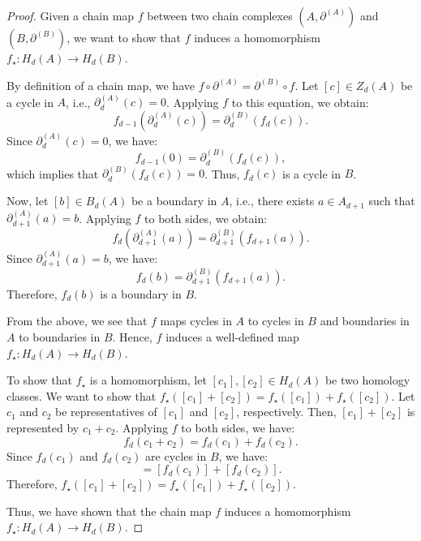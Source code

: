 \begin{proof}
Given a chain map $f$ between two chain complexes $(A, \partial^{(A)})$ and $(B, \partial^{(B)})$, we want to show that $f$ induces a homomorphism $f_\star: H_d(A) \rightarrow H_d(B)$.

By definition of a chain map, we have $f \circ \partial^{(A)} = \partial^{(B)} \circ f$. Let $[c] \in Z_d(A)$ be a cycle in $A$, i.e., $\partial^{(A)}_d(c) = 0$. Applying $f$ to this equation, we obtain:
\begin{equation}
f_{d-1}(\partial^{(A)}_d(c)) = \partial^{(B)}_d(f_d(c)).
\end{equation}
Since $\partial^{(A)}_d(c) = 0$, we have:
\begin{equation}
f_{d-1}(0) = \partial^{(B)}_d(f_d(c)),
\end{equation}
which implies that $\partial^{(B)}_d(f_d(c)) = 0$. Thus, $f_d(c)$ is a cycle in $B$.

Now, let $[b] \in B_d(A)$ be a boundary in $A$, i.e., there exists $a \in A_{d+1}$ such that $\partial^{(A)}_{d+1}(a) = b$. Applying $f$ to both sides, we obtain:
\begin{equation}
f_d(\partial^{(A)}_{d+1}(a)) = \partial^{(B)}_{d+1}(f_{d+1}(a)).
\end{equation}
Since $\partial^{(A)}_{d+1}(a) = b$, we have:
\begin{equation}
f_d(b) = \partial^{(B)}_{d+1}(f_{d+1}(a)).
\end{equation}
Therefore, $f_d(b)$ is a boundary in $B$.

From the above, we see that $f$ maps cycles in $A$ to cycles in $B$ and boundaries in $A$ to boundaries in $B$. Hence, $f$ induces a well-defined map $f_\star: H_d(A) \rightarrow H_d(B)$.

To show that $f_\star$ is a homomorphism, let $[c_1], [c_2] \in H_d(A)$ be two homology classes. We want to show that $f_\star([c_1] + [c_2]) = f_\star([c_1]) + f_\star([c_2])$. Let $c_1$ and $c_2$ be representatives of $[c_1]$ and $[c_2]$, respectively. Then, $[c_1] + [c_2]$ is represented by $c_1 + c_2$. Applying $f$ to both sides, we have:
\begin{equation}
f_d(c_1 + c_2) = f_d(c_1) + f_d(c_2).
\end{equation}
Since $f_d(c_1)$ and $f_d(c_2)$ are cycles in $B$, we have:
\begin{equation}
[f_d(c_1 + c_2)] = [f_d(c_1)] + [f_d(c_2)].
\end{equation}
Therefore, $f_\star([c_1] + [c_2]) = f_\star([c_1]) + f_\star([c_2])$.

Thus, we have shown that the chain map $f$ induces a homomorphism $f_\star: H_d(A) \rightarrow H_d(B)$.
\end{proof}

